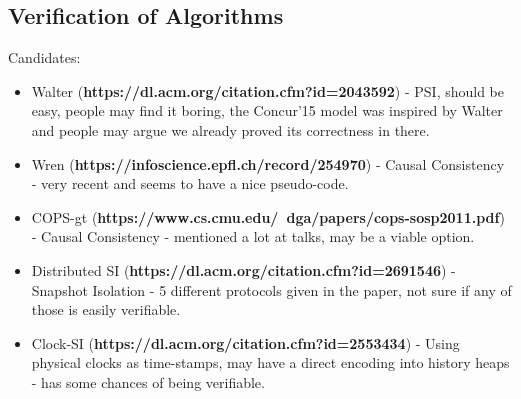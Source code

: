 \documentclass[a4paper,UKenglish]{article}%
\theoremstyle{plain}
\begin{document}
\subsection{Verification of Algorithms} 
Candidates: 
\begin{itemize}
\item Walter (\textbf{https://dl.acm.org/citation.cfm?id=2043592}) - PSI, should be easy, 
people may find it boring, the Concur'15 model was inspired by Walter and people may argue we 
already proved its correctness in there.
\item Wren (\textbf{https://infoscience.epfl.ch/record/254970}) - Causal Consistency - very recent and seems to have 
a nice pseudo-code.\\
\item COPS-gt (\textbf{https://www.cs.cmu.edu/~dga/papers/cops-sosp2011.pdf}) - Causal Consistency -  mentioned a lot at 
talks, may be a viable option.
\item Distributed SI (\textbf{https://dl.acm.org/citation.cfm?id=2691546}) - Snapshot Isolation - 5 different protocols given in the paper, 
not sure if any of those is easily verifiable.\\ 
\item Clock-SI (\textbf{https://dl.acm.org/citation.cfm?id=2553434}) - Using physical clocks as time-stamps, may have a direct encoding 
into history heaps - has some chances of being verifiable.
\end{itemize}
\end{document}
